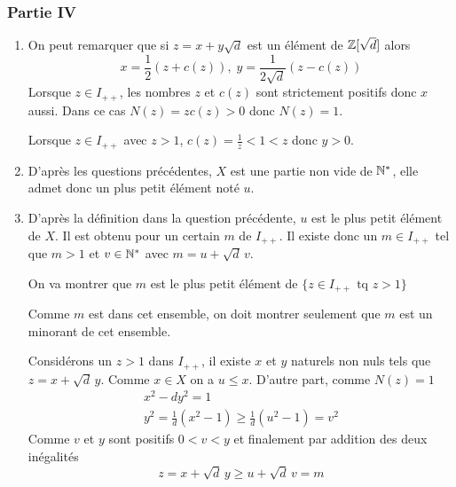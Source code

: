 \subsubsection*{Partie IV}
\begin{enumerate}
\item On peut remarquer que si $z=x+y\sqrt d$ est un élément de $\mathbb{Z}[\sqrt d ]$ alors
$$x=\frac{1}{2}(z+c(z)),\; y=\frac{1}{2\sqrt d }(z-c(z))$$
Lorsque $z\in I_{++}$,  les nombres $z$ et $c(z)$ sont strictement positifs donc $x$ aussi. Dans ce cas $N(z)=zc(z)>0$ donc $N(z)=1$.

Lorsque $z\in I_{++}$ avec $z>1$, $c(z)=\frac{1}{z}<1<z$ donc $y>0$.
\item D'après les questions précédentes, $X$ est une partie non vide de $\mathbb{N}^{*}$, elle admet donc un plus petit élément noté $u$.
\item D'après la définition dans la question précédente, $u$ est le plus petit élément de $X$. Il est obtenu pour un certain $m$ de $I_{++}$. Il existe donc un $m\in I_{++}$ tel que $m>1$ et $v \in \mathbb{N}^{*}$ avec $m=u+\sqrt d \, v$.

On va montrer que $m$ est le plus petit élément de $\{z\in I_{++} \text{ tq }z>1\}$

Comme $m$ est dans cet ensemble, on doit montrer seulement que $m$ est un minorant de cet ensemble.

Considérons un $z>1$ dans $I_{++}$, il existe $x$ et $y$ naturels non nuls tels que $z=x+\sqrt d \, y$. Comme $x\in X$ on a $u\leq x$. D'autre part, comme $N(z)=1$
\begin{eqnarray*}
x^2-dy^2=1\\
y^2=\frac{1}{d}(x^2-1)\geq \frac{1}{d}(u^2-1)=v^2
\end{eqnarray*}
Comme $v$ et $y$ sont positifs $0<v<y$ et finalement par addition des deux inégalités $$ z=x+\sqrt d \, y \geq u+\sqrt d \, v=m$$
\end{enumerate}
